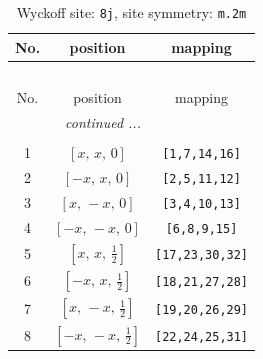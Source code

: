 \documentclass[fleqn,8pt]{jsarticle}
\begin{document}
\begin{longtable}{ccc}
\caption{Wyckoff site: {\tt 8j}, site symmetry: {\tt m.2m}}
 \\
 \hline \hline
No. & position & mapping \\ \hline \endfirsthead

\multicolumn{2}{l}{\tablename\ \thetable{}} \\
 \hline \hline
No. & position & mapping \\ \hline \endhead

 \hline \hline
\multicolumn{2}{r}{\footnotesize\it continued ...} \\ \endfoot

 \hline \hline
\multicolumn{2}{r}{} \\ \endlastfoot

1 & $\left[ x,\, x,\, 0 \right]$ & {\tt [1,7,14,16]} \\ \hline
2 & $\left[ - x,\, x,\, 0 \right]$ & {\tt [2,5,11,12]} \\ \hline
3 & $\left[ x,\, - x,\, 0 \right]$ & {\tt [3,4,10,13]} \\ \hline
4 & $\left[ - x,\, - x,\, 0 \right]$ & {\tt [6,8,9,15]} \\ \hline
5 & $\left[ x,\, x,\, \frac{1}{2} \right]$ & {\tt [17,23,30,32]} \\ \hline
6 & $\left[ - x,\, x,\, \frac{1}{2} \right]$ & {\tt [18,21,27,28]} \\ \hline
7 & $\left[ x,\, - x,\, \frac{1}{2} \right]$ & {\tt [19,20,26,29]} \\ \hline
8 & $\left[ - x,\, - x,\, \frac{1}{2} \right]$ & {\tt [22,24,25,31]} \\
\end{longtable}
\renewcommand{\arraystretch}{1.2}
\end{document}

